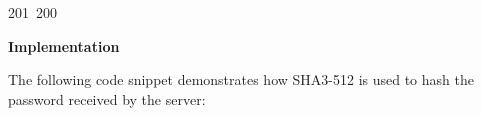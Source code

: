 201~200~\documentclass{article}
\begin{document}
	                                                                                                                                                                                                                                                                                                	                                                                                                                                        	    	                                                                                                	                                                                                                                                                                                                                                                                                                                                	                                                                        	                                                                        	                                                                                                                                        	                                                                                        \textbf{Implementation}

	                                                                                                                                                                                                                                                                                                	                                                                                                                                        	    	                                                                                                	                                                                                                                                                                                                                                                                                                                                	                                                                        	                                                                        	                                                                                                                                        	                                                                                        The following code snippet demonstrates how SHA3-512 is used to hash the password received by the server:
\end{document}

